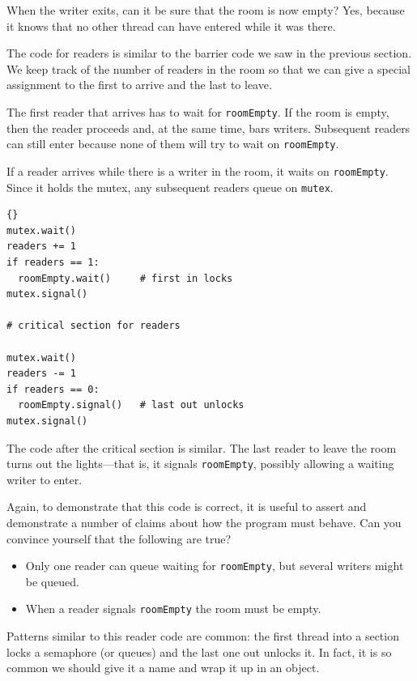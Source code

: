 \documentclass{book}
\begin{document}
When the writer exits, can it be sure that the room is
now empty?  Yes, because it knows that no other thread can
have entered while it was there.

The code for readers is similar to the barrier code we
saw in the previous section.  We keep track of the number
of readers in the room so that we can give a special assignment
to the first to arrive and the last to leave.

The first reader that arrives has to wait for {\tt roomEmpty}.
If the room is empty, then the reader proceeds and, at the
same time, bars writers.  Subsequent readers can still enter
because none of them will try to wait on {\tt roomEmpty}.

If a reader arrives while there is a writer in the room,
it waits on {\tt roomEmpty}.  Since it holds the mutex, any
subsequent readers queue on {\tt mutex}.

\newpage
\begin{lstlisting}[title={Readers solution}]{}
mutex.wait()
readers += 1
if readers == 1:
  roomEmpty.wait()     # first in locks
mutex.signal()

# critical section for readers

mutex.wait()
readers -= 1
if readers == 0:
  roomEmpty.signal()   # last out unlocks
mutex.signal()
\end{lstlisting}

The code after the critical section is similar.  The last reader
to leave the room turns out the lights---that is, it signals
    {\tt roomEmpty}, possibly allowing a waiting writer to enter.

Again, to demonstrate that this code is correct, it is useful
to assert and demonstrate a number of claims about how the program
must behave.  Can you convince yourself that the following are
true?

\begin{itemize}

    \item Only one reader can queue waiting for {\tt roomEmpty},
          but several writers might be queued.

    \item When a reader signals {\tt roomEmpty} the room must
          be empty.

\end{itemize}

Patterns similar to this reader code are common: the first thread into
a section locks a semaphore (or queues) and the last one out unlocks
it.  In fact, it is so common we should give it a name and wrap it up
in an object.
\end{document}
